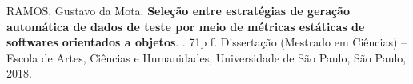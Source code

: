 \documentclass[
	12pt,				%
	oneside,			%
	a4paper,			%
	english,			%
	brazil				%
	]{abntex2ppgsi}
\begin{document}

%
% 



\setlength{\absparsep}{18pt} %
\begin{resumo}

% 
%
% 
%
\begin{flushleft}
RAMOS, Gustavo da Mota. \textbf{ Seleção entre estratégias de geração automática de dados de teste por meio de métricas estáticas de softwares orientados a objetos}. \imprimirdata. 71p f. Dissertação (Mestrado em Ciências) – Escola de Artes, Ciências e Humanidades, Universidade de São Paulo, São Paulo, 2018.
\end{flushleft}


\end{resumo}
\end{document}
